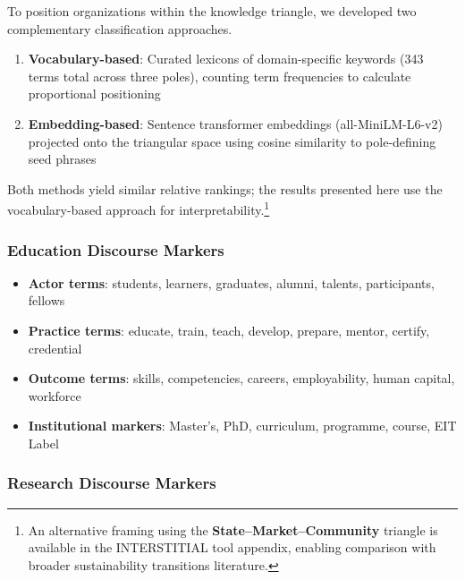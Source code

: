 \documentclass[../main.tex]{subfiles}
\begin{document}
To position organizations within the knowledge triangle, we developed two complementary classification approaches.

\begin{enumerate}
    \item \textbf{Vocabulary-based}: Curated lexicons of domain-specific keywords (343 terms total across three poles), counting term frequencies to calculate proportional positioning
    \item \textbf{Embedding-based}: Sentence transformer embeddings (all-MiniLM-L6-v2) projected onto the triangular space using cosine similarity to pole-defining seed phrases
\end{enumerate}

Both methods yield similar relative rankings; the results presented here use the vocabulary-based approach for interpretability.\footnote{An alternative framing using the \textbf{State--Market--Community} triangle \cite{avelino2014shifting} is available in the INTERSTITIAL tool appendix, enabling comparison with broader sustainability transitions literature.}

\subsubsection{Education Discourse Markers}

\begin{itemize}
    \item \textbf{Actor terms}: students, learners, graduates, alumni, talents, participants, fellows
    \item \textbf{Practice terms}: educate, train, teach, develop, prepare, mentor, certify, credential
    \item \textbf{Outcome terms}: skills, competencies, careers, employability, human capital, workforce
    \item \textbf{Institutional markers}: Master's, PhD, curriculum, programme, course, EIT Label
\end{itemize}

\subsubsection{Research Discourse Markers}
\end{document}
